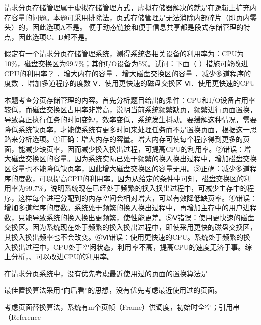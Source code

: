 \begin{solution}请求分页存储管理属于虚拟存储管理方式，虚拟存储器解决的就是在逻辑上扩充内存容量的问题。本题可采用排除法，页式存储管理是无法消除内部碎片（即页内零头）的，因此选项A不是。
便于动态链接和便于信息共享都是段式存储管理的特点，因此选项C、D都不是。
\end{solution}
\question 假定有一个请求分页存储管理系统，测得系统各相关设备的利用率为：CPU为10\%，磁盘交换区为99.7\%；其他I/O设备为5\%。试问：下面（
）措施可能改进CPU的利用率？ ．增大内存的容量 ．增大磁盘交换区的容量
．减少多道程序的度数 ．增加多道程序的度数 Ⅴ．使用更快速的磁盘交换区
Ⅵ．使用更快速的CPU
\par{}
\begin{solution}本题考查分页存储管理的内容。首先分析题目给出的条件：CPU和I/O设备占用率较低，而磁盘交换区占用率非常高，说明当前系统频繁缺页，频繁进行页面置换，导致真正执行任务的时间变短，效率变低，系统发生抖动。要缓解这种情况，需要降低系统缺页率，才能使系统有更多时间来处理任务而不是置换页面，根据这一思路来分析选项。①正确：增大内存的容量。增大内存可使每个程序得到更多的页面，能减少缺页率，因而减少换入换出过程，可提高CPU的利用率。②错误：增大磁盘交换区的容量。因为系统实际已处于频繁的换入换出过程中，增加磁盘交换区容量也不能降低缺页率，因此增大磁盘交换区的容量无用。③正确：减少多道程序的度数，可以提高CPU的利用率。因为从给定的条件中可知，磁盘交换区的利用率为99.7\%，说明系统现在已经处于频繁的换入换出过程中，可减少主存中的程序，这样每个进程分配到的内存空间会相对增大，可以有效降低缺页率。④错误：增加多道程序的度数。系统处于频繁的换入换出过程中，再增加主存中的用户进程数，只能导致系统的换入换出更频繁，使性能更差。⑤Ⅴ错误：使用更快速的磁盘交换区。因为系统现在处于频繁的换入换出过程中，即使采用更快的磁盘交换区，其换入换出频率也不会改变。⑥Ⅵ错误：使用更快速的CPU。系统处于频繁的换入换出过程中，CPU处于空闲状态，利用率不高，提高CPU的速度无济于事。综上分析，、可以改进CPU的利用率。
\end{solution}
\question 在请求分页系统中，没有优先考虑最近使用过的页面的置换算法是
\par{}
\begin{solution}最佳置换算法采用``向后看''的思想，没有优先考虑最近使用过的页面。
\end{solution}
\question 考虑页面替换算法，系统有m个页帧（Frame）供调度，初始时全空；引用串（Reference
